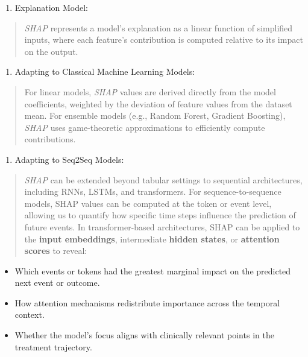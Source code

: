 \documentclass[
]{article}
\begin{document}
\begin{enumerate}
\def\labelenumi{\arabic{enumi}.}
\item
  Explanation Model:
\end{enumerate}

\begin{quote}
\emph{SHAP} represents a model's explanation as a linear function of
simplified inputs, where each feature's contribution is computed
relative to its impact on the output.
\end{quote}

\begin{enumerate}
\def\labelenumi{\arabic{enumi}.}
\setcounter{enumi}{1}
\item
  Adapting to Classical Machine Learning Models:
\end{enumerate}

\begin{quote}
For linear models, \emph{SHAP} values are derived directly from the
model coefficients, weighted by the deviation of feature values from the
dataset mean. For ensemble models (e.g., Random Forest, Gradient
Boosting), \emph{SHAP} uses game-theoretic approximations to efficiently
compute contributions.
\end{quote}

\begin{enumerate}
\def\labelenumi{\arabic{enumi}.}
\setcounter{enumi}{2}
\item
  Adapting to Seq2Seq Models:
\end{enumerate}

\begin{quote}
\emph{SHAP} can be extended beyond tabular settings to sequential
architectures, including RNNs, LSTMs, and transformers. For
sequence-to-sequence models, SHAP values can be computed at the token or
event level, allowing us to quantify how specific time steps influence
the prediction of future events. In transformer-based architectures,
SHAP can be applied to the \textbf{input embeddings}, intermediate
\textbf{hidden states}, or \textbf{attention scores} to reveal:
\end{quote}

\begin{itemize}
\item
  Which events or tokens had the greatest marginal impact on the
  predicted next event or outcome.
\item
  How attention mechanisms redistribute importance across the temporal
  context.
\item
  Whether the model's focus aligns with clinically relevant points in
  the treatment trajectory.
\end{itemize}
\end{document}
